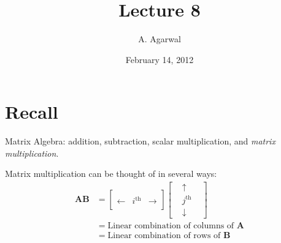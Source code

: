 \documentclass[11pt]{article}
\title{Lecture 8}
\author{A. Agarwal}
\date{February 14, 2012}
\newcommand{\mat}[1]{\mathbf{#1}}
\begin{document}

\section*{Recall}

Matrix Algebra: addition, subtraction, scalar multiplication, and \emph{matrix multiplication}.

Matrix multiplication can be thought of in several ways:
\begin{align*}
\mat{A} \mat{B} &=
\begin{bmatrix}
\,&&\\
\leftarrow & i^{\text{th}} & \rightarrow \\
&&
\end{bmatrix}
\begin{bmatrix}
\!&\uparrow& \\
& j^{\text{th}} & \\
&\downarrow&
\end{bmatrix}
\\
&= \text{Linear combination of columns of $\mat{A}$}
\\
&= \text{Linear combination of rows of $\mat{B}$}
\end{align*}
\end{document}
